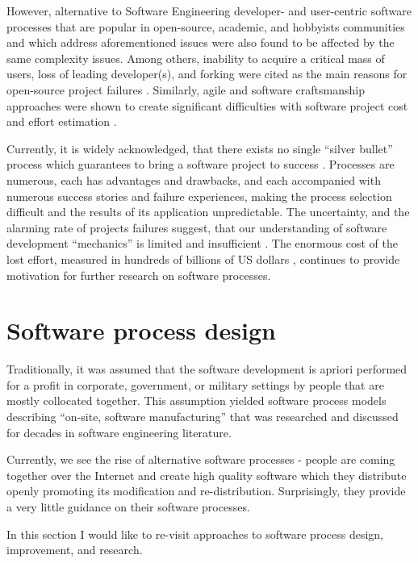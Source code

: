 However, alternative to Software Engineering developer- and user-centric software processes that are 
popular in open-source, academic, and hobbyists communities and which address aforementioned issues 
were also found to be affected by the same complexity issues. 
Among others, inability to acquire a critical mass of users, loss of leading developer(s), and forking 
were cited as the main reasons for open-source project failures \cite{richter2007critique}. 
Similarly, agile and software craftsmanship approaches were shown to create significant difficulties with 
software project cost and effort estimation \cite{citeulike:12933080} \cite{citeulike:9928907}.

Currently, it is widely acknowledged, that there exists no single ``silver bullet'' process which 
guarantees to bring a software project to success \cite{citeulike:1986013}. 
Processes are numerous, each has advantages and drawbacks, and each accompanied with 
numerous success stories and failure experiences, making the process selection difficult 
and the results of its application unpredictable.
The uncertainty, and the alarming rate of projects failures suggest, that our understanding 
of software development ``mechanics'' is limited and insufficient \cite{citeulike:12550665}. 
The enormous cost of the lost effort, measured in hundreds of billions of US dollars 
\cite{citeulike:2207657} \cite{citeulike:2207653} \cite{citeulike:2207655}, 
continues to provide motivation for further research on software processes. 

%
%
\section{Software process design}\label{section_software_process_design}
Traditionally, it was assumed that the software development is apriori performed for 
a profit in corporate, government, or military settings by people that are mostly collocated 
together. This assumption yielded software process models describing ``on-site, software manufacturing'' 
that was researched and discussed for decades in software  engineering literature. 

Currently, we see the rise of alternative software processes - people are coming 
together over the Internet and create high quality software which they distribute openly 
promoting its modification and re-distribution. Surprisingly, they provide a very little 
guidance on their software processes. 

In this section I would like to re-visit approaches to software process design, improvement, and research.

